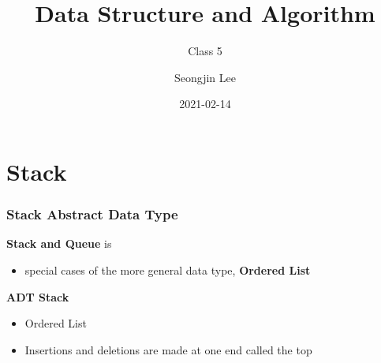 \documentclass[newPxFont,sthlmFooter,nooffset]{beamer}
\title{Data Structure and Algorithm}
\subtitle{Class 5}
\author[SJL]{Seongjin Lee}
\institute{\href{mailto:insight@gnu.ac.kr}{insight@gnu.ac.kr}\\\url{http://resourceful.github.io}\\Systems Research Lab.\\GNU}
\date{2021-02-14}
\begin{document}
\frame[plain,t]{\titlepage} 



\section{Stack} 
\begin{frame}[t]
  \frametitle{Stack Abstract Data Type}
\textbf{Stack and Queue} is
\begin{itemize}
\item special cases of the more general data type, \textbf{Ordered List}
\end{itemize}

\textbf{ADT Stack}
\begin{itemize}
\item Ordered List
\item Insertions and deletions are made at one end called the top
\end{itemize}
\end{frame}
\end{document}
